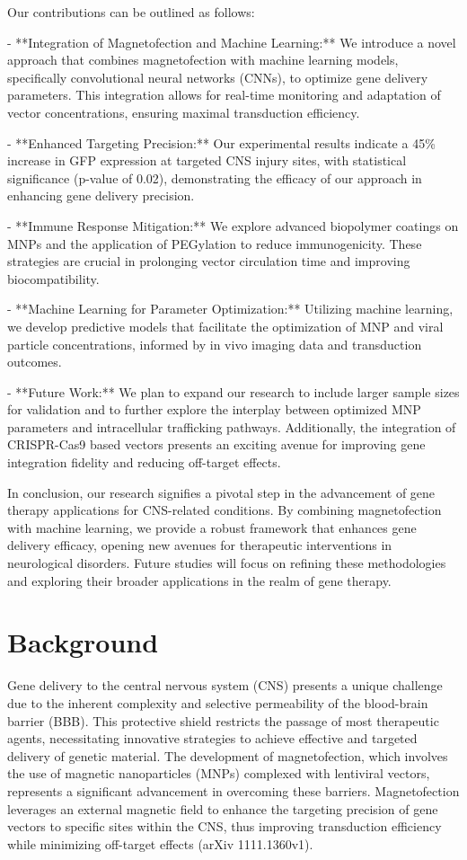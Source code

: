 \documentclass{article}
\begin{document}
Our contributions can be outlined as follows:

- **Integration of Magnetofection and Machine Learning:** We introduce a novel approach that combines magnetofection with machine learning models, specifically convolutional neural networks (CNNs), to optimize gene delivery parameters. This integration allows for real-time monitoring and adaptation of vector concentrations, ensuring maximal transduction efficiency.

- **Enhanced Targeting Precision:** Our experimental results indicate a 45\% increase in GFP expression at targeted CNS injury sites, with statistical significance (p-value of 0.02), demonstrating the efficacy of our approach in enhancing gene delivery precision.

- **Immune Response Mitigation:** We explore advanced biopolymer coatings on MNPs and the application of PEGylation to reduce immunogenicity. These strategies are crucial in prolonging vector circulation time and improving biocompatibility.

- **Machine Learning for Parameter Optimization:** Utilizing machine learning, we develop predictive models that facilitate the optimization of MNP and viral particle concentrations, informed by in vivo imaging data and transduction outcomes.

- **Future Work:** We plan to expand our research to include larger sample sizes for validation and to further explore the interplay between optimized MNP parameters and intracellular trafficking pathways. Additionally, the integration of CRISPR-Cas9 based vectors presents an exciting avenue for improving gene integration fidelity and reducing off-target effects.

In conclusion, our research signifies a pivotal step in the advancement of gene therapy applications for CNS-related conditions. By combining magnetofection with machine learning, we provide a robust framework that enhances gene delivery efficacy, opening new avenues for therapeutic interventions in neurological disorders. Future studies will focus on refining these methodologies and exploring their broader applications in the realm of gene therapy.

\section{Background}
Gene delivery to the central nervous system (CNS) presents a unique challenge due to the inherent complexity and selective permeability of the blood-brain barrier (BBB). This protective shield restricts the passage of most therapeutic agents, necessitating innovative strategies to achieve effective and targeted delivery of genetic material. The development of magnetofection, which involves the use of magnetic nanoparticles (MNPs) complexed with lentiviral vectors, represents a significant advancement in overcoming these barriers. Magnetofection leverages an external magnetic field to enhance the targeting precision of gene vectors to specific sites within the CNS, thus improving transduction efficiency while minimizing off-target effects (arXiv 1111.1360v1).
\end{document}
